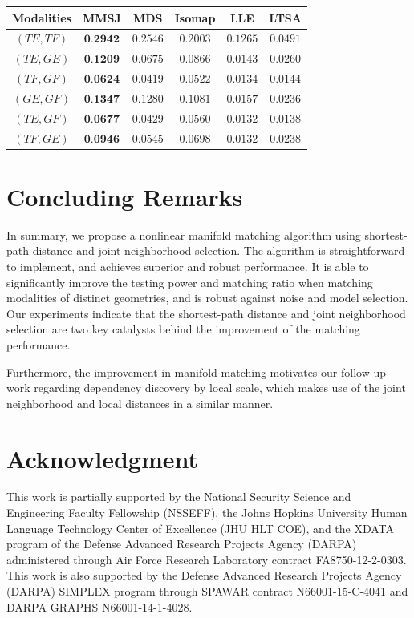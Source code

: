 \documentclass[times,twocolumn,final]{elsarticle}
\newenvironment{Table}
  {\par\bigskip\noindent\minipage{\columnwidth}\centering}
  {\endminipage\par\bigskip}
\begin{document}
\begin{Table}
\centering
{}
\label{table:wikiAcc}%
\begin{tabular}{|c||c|c|c|c|c|}
\hline
Modalities & MMSJ & MDS & Isomap & LLE & LTSA \\
\hline
$(TE, TF)$ & $\textbf{0.2942}$  & $0.2546$ & $0.2003$ & $0.1265$ & $0.0491$\\
\hline
$(TE, GE)$ & $\textbf{0.1209}$  & $0.0675$ & $0.0866$ & $0.0143$ & $0.0260$\\
\hline
$(TF, GF)$ & $\textbf{0.0624}$  & $0.0419$ & $0.0522$ & $0.0134$ & $0.0144$\\
\hline
$(GE, GF)$ & $\textbf{0.1347}$  & $0.1280$ & $0.1081$ & $0.0157$ & $0.0236$\\
\hline
$(TE, GF)$ & $\textbf{0.0677}$  & $0.0429$ & $0.0560$ & $0.0132$ & $0.0138$\\
\hline
$(TF, GE)$ & $\textbf{0.0946}$  & $0.0545$ & $0.0698$ & $0.0132$ & $0.0238$\\
\hline
\end{tabular}
\end{Table}

\section{Concluding Remarks}
\label{conclu}
In summary, we propose a nonlinear manifold matching algorithm using shortest-path distance and joint neighborhood selection. The algorithm is straightforward to implement, and achieves superior and robust performance. It is able to significantly improve the testing power and matching ratio when matching modalities of distinct geometries, and is robust against noise and model selection. Our experiments indicate that the shortest-path distance and joint neighborhood selection are two key catalysts behind the improvement of the matching performance.

Furthermore, the improvement in manifold matching motivates our follow-up work \citep{ShenEtAl2016} regarding dependency discovery by local scale, which makes use of the joint neighborhood and local distances in a similar manner.

\section*{Acknowledgment}
This work is partially supported by the National Security Science and Engineering Faculty Fellowship (NSSEFF),
 the Johns Hopkins University Human Language Technology Center of Excellence (JHU HLT COE), and the
 XDATA program of the Defense Advanced Research Projects Agency (DARPA) administered through Air Force Research Laboratory contract FA8750-12-2-0303. This work is also supported by the Defense Advanced Research Projects Agency (DARPA) SIMPLEX program through SPAWAR contract N66001-15-C-4041 and DARPA GRAPHS N66001-14-1-4028.





\end{document}
